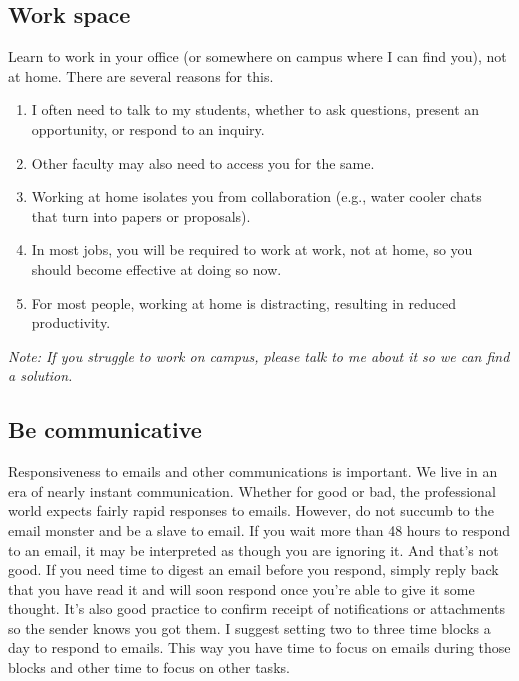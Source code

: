 \documentclass[
]{article}
\providecommand{\tightlist}{%
  \setlength{\itemsep}{0pt}\setlength{\parskip}{0pt}}
\begin{document}
\hypertarget{work-space}{%
\subsection{Work space}\label{work-space}}

Learn to work in your office (or somewhere on campus where I can find you), not at home. There are several reasons for this.

\begin{enumerate}
\def\labelenumi{\arabic{enumi})}
\tightlist
\item
  I often need to talk to my students, whether to ask questions, present an opportunity, or respond to an inquiry.
\item
  Other faculty may also need to access you for the same.
\item
  Working at home isolates you from collaboration (e.g., water cooler chats that turn into papers or proposals).
\item
  In most jobs, you will be required to work at work, not at home, so you should become effective at doing so now.
\item
  For most people, working at home is distracting, resulting in reduced productivity.
\end{enumerate}

\emph{Note: If you struggle to work on campus, please talk to me about it so we can find a solution.}

\hypertarget{be-communicative}{%
\subsection{Be communicative}\label{be-communicative}}

Responsiveness to emails and other communications is important. We live in an era of nearly instant communication. Whether for good or bad, the professional world expects fairly rapid responses to emails. However, do not succumb to the email monster and be a slave to email. If you wait more than 48 hours to respond to an email, it may be interpreted as though you are ignoring it. And that's not good. If you need time to digest an email before you respond, simply reply back that you have read it and will soon respond once you're able to give it some thought. It's also good practice to confirm receipt of notifications or attachments so the sender knows you got them. I suggest setting two to three time blocks a day to respond to emails. This way you have time to focus on emails during those blocks and other time to focus on other tasks.
\end{document}
